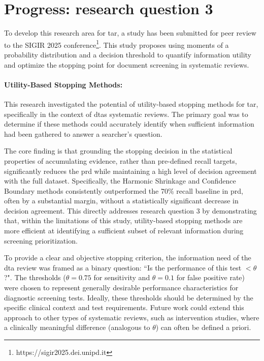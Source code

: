 \documentclass[10pt,oneside]{book}
\begin{document}
\section{Progress: research question 3}

To develop this research area for \gls*{tar}, a study has been submitted for peer review to the SIGIR 2025 conference\footnote{https://sigir2025.dei.unipd.it}. This study proposes using moments of a probability distribution and a decision threshold to quantify information utility and optimize the stopping point for document screening in systematic reviews.

\paragraph{Utility-Based Stopping Methods: }This research investigated the potential of utility-based stopping methods for \gls*{tar}, specifically in the context of \glspl*{dta} systematic reviews. The primary goal was to determine if these methods could accurately identify when sufficient information had been gathered to answer a searcher's question.

The core finding is that grounding the stopping decision in the statistical properties of accumulating evidence, rather than pre-defined recall targets, significantly reduces the \gls*{prd} while maintaining a high level of decision agreement with the full dataset.  Specifically, the Harmonic Shrinkage and Confidence Boundary methods consistently outperformed the 70\% recall baseline in \gls*{prd}, often by a substantial margin, without a statistically significant decrease in decision agreement. This directly addresses research question 3 by demonstrating that, within the limitations of this study, utility-based stopping methods are more efficient at identifying a sufficient subset of relevant information during screening prioritization.

To provide a clear and objective stopping criterion, the information need of the \gls*{dta} review was framed as a binary question: ``Is the performance of this test  $< \theta$?". The thresholds ($\theta = 0.75$ for sensitivity and $\theta = 0.1$ for false positive rate) were chosen to represent generally desirable performance characteristics for diagnostic screening tests. Ideally, these thresholds should be determined by the specific clinical context and test requirements. Future work could extend this approach to other types of systematic reviews, such as intervention studies, where a clinically meaningful difference (analogous to $\theta$) can often be defined a priori.
\end{document}
